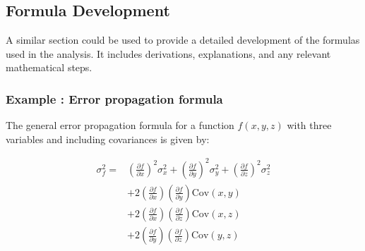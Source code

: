 \documentclass[a4paper, twocolumn]{article}
\begin{document}
\subsection{Formula Development}
A similar section could be used to provide a detailed development of the formulas used in the analysis. It includes derivations, explanations, and any relevant mathematical steps.

\subsubsection{Example : Error propagation formula}
The general error propagation formula for a function \( f(x, y, z) \) with three variables and including covariances is given by:

\begin{align}
\sigma_f^2 = &\left( \frac{\partial f}{\partial x} \right)^2 \sigma_x^2 
+ \left( \frac{\partial f}{\partial y} \right)^2 \sigma_y^2 
+ \left( \frac{\partial f}{\partial z} \right)^2 \sigma_z^2 \nonumber \\
&+ 2 \left( \frac{\partial f}{\partial x} \right) \left( \frac{\partial f}{\partial y} \right) \text{Cov}(x, y) \nonumber \\
&+ 2 \left( \frac{\partial f}{\partial x} \right) \left( \frac{\partial f}{\partial z} \right) \text{Cov}(x, z) \nonumber \\
&+ 2 \left( \frac{\partial f}{\partial y} \right) \left( \frac{\partial f}{\partial z} \right) \text{Cov}(y, z)
\end{align}
\end{document}
